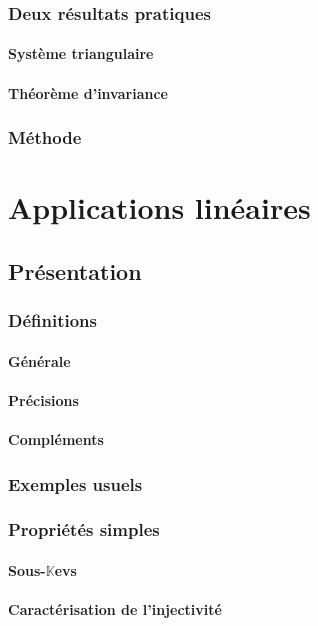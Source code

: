 \documentclass[12pt,a4paper,french]{book}
\begin{document}
		\subsection{Deux résultats pratiques}
			\subsubsection{Système triangulaire}
			\subsubsection{Théorème d'invariance}
		\subsection{Méthode}

\chapter{Applications linéaires}
	\section{Présentation}
		\subsection{Définitions}
			\subsubsection{Générale}
			\subsubsection{Précisions}
			\subsubsection{Compléments}
		\subsection{Exemples usuels}
		\subsection{Propriétés simples}
			\subsubsection{Sous-$\mathbb{K}$evs}
			\subsubsection{Caractérisation de l'injectivité}
\end{document}
